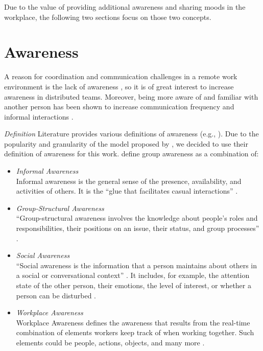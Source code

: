 Due to the value of providing additional awareness and sharing moods in the workplace, the following two sections focus on those two concepts.

\section{Awareness}
\label{section:awareness}
A reason for coordination and communication challenges in a remote work environment is the lack of awareness \autocite{herbsleb2007global, gutwin2004group}, so it is of great interest to increase awareness in distributed teams. Moreover, being more aware of and familiar with another person has been shown to increase communication frequency \autocite{chang2007out} and informal interactions \autocite{}.

\medskip\noindent\textit{Definition}
Literature provides various definitions of awareness (e.g., \autocite{chang2007out, gross2013supporting, gross2005user}). Due to the popularity and granularity of the model proposed by \textcite{gutwin1996workspace}, we decided to use their definition of awareness for this work. \textcite{gutwin1996workspace} define group awareness as a combination of:


\begin{itemize}[itemsep=0ex, parsep=1ex, leftmargin=*]
      \item \textit{Informal Awareness} \\
            Informal awareness is the general sense of the presence, availability, and activities of others. It is the \enquote{glue that facilitates casual interactions} \autocite[p.~6]{gutwin1996workspace}.
      \item \textit{Group-Structural Awareness} \\
            \enquote{Group-structural awareness involves the knowledge about people’s roles and responsibilities, their positions on an issue, their status, and group processes} \autocite[p.~6]{gutwin1996workspace}.
      \item \textit{Social Awareness} \\
            \enquote{Social awareness is the information that a person maintains about others in a social or conversational context} \autocite[p.~6]{gutwin1996workspace}. It includes, for example, the attention state of the other person, their emotions, the level of interest, or whether a person can be disturbed \autocite{gutwin1995support}.
      \item \textit{Workplace Awareness} \\
            Workplace Awareness defines the awareness that results from the real-time combination of elements workers keep track of when working together. Such elements could be people, actions, objects, and many more \autocite{gutwin1995support}.
\end{itemize}

